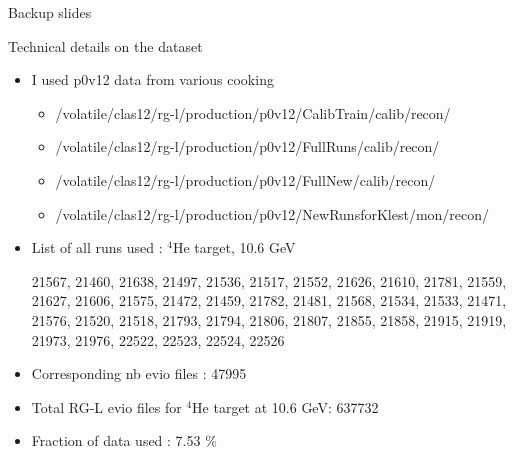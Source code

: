 \documentclass[10pt,aspectratio=43]{beamer}
\begin{document}
\appendix
\begin{frame}
    \centering
    \Huge Backup slides
\end{frame}


\begin{frame}{Technical details on the dataset}
    \begin{itemize}
        \item I used p0v12 data from various cooking
            \begin{itemize}
                \item /volatile/clas12/rg-l/production/p0v12/CalibTrain/calib/recon/
                \item /volatile/clas12/rg-l/production/p0v12/FullRuns/calib/recon/
                \item /volatile/clas12/rg-l/production/p0v12/FullNew/calib/recon/
                \item /volatile/clas12/rg-l/production/p0v12/NewRunsforKlest/mon/recon/
            \end{itemize}
        \item List of all runs used : $^4\mbox{He}$ target, 10.6 GeV
        
        21567, 21460, 21638, 21497, 21536, 21517, 21552, 21626, 21610, 21781, 21559, 21627, 21606, 21575, 21472, 21459, 21782, 21481, 21568, 21534, 21533, 21471, 21576, 21520, 21518, 21793, 21794, 21806, 21807, 21855, 21858, 21915, 21919, 21973, 21976, 22522, 22523, 22524, 22526

        \item Corresponding nb evio files : 47995
        \item Total RG-L evio files for $^4\mbox{He}$ target at  10.6 GeV: 637732
        \item {\color{red}Fraction of data used : 7.53 \%}

    \end{itemize}
    
\end{frame}
\end{document}
